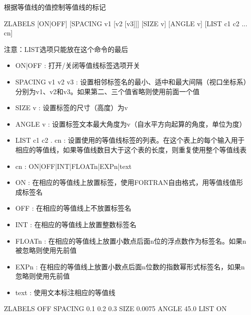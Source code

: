 \label{cmd:zlabels}

根据等值线的值控制等值线的标记

\begin{SACSTX}
ZLABELS [ON|OFF] [SPACING v1 [v2 [v3]]] [SIZE v] [ANGLE v] [LIST c1 c2 ... cn]
\end{SACSTX}
注意：LIST选项只能放在这个命令的最后

\begin{itemize}
\item ON|OFF : 打开/关闭等值线标签选项开关 
\item SPACING v1 v2 v3 : 设置相邻标签名的最小、适中和最大间隔（视口坐标系）分别为v1、v2和v3。如果第二、三个值省略则使用前面一个值 
\item SIZE v : 设置标签的尺寸（高度）为v 
\item ANGLE v : 设置标签文本最大角度为v（自水平方向起算的角度，单位为度） 
\item LIST c1 c2 . cn : 设置使用的等值线标签的列表。在这个表上的每个输入用于相应的等值线，如果等值线数目大于这个表的长度，则重复使用整个等值线表 
\item cn :  ON|OFF|INT|FLOATn|EXPn|text 
\item ON : 在相应的等值线上放置标签，使用FORTRAN自由格式，用等值线值形成标签名 
\item OFF : 在相应的等值线上不放置标签名 
\item INT : 在相应的等值线上放置整数标签名 
\item FLOATn : 在相应的等值线上放置小数点后面n位的浮点数作为标签名。如果n被忽略则使用先前值 
\item EXPn : 在相应的等值线上放置小数点后面n位数的指数幂形式标签名，如果n忽略则使用先前值 
\item text : 使用文本标注相应的等值线 
\end{itemize}

\begin{SACDFT}
ZLABELS  OFF  SPACING 0.1 0.2 0.3  SIZE  0.0075 ANGLE 45.0  LIST ON
\end{SACDFT}

